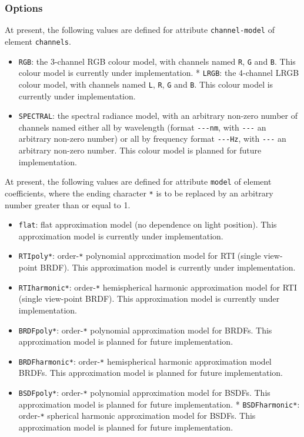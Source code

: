 \hypertarget{options}{%
\subsubsection{Options}\label{options}}

At present, the following values are defined for attribute
\texttt{channel-model} of element \texttt{channels}.
\begin{itemize}
\item \texttt{RGB}: the
3-channel RGB colour model, with channels named \texttt{R}, \texttt{G}
and \texttt{B}. This colour model is currently under implementation. *
\texttt{LRGB}: the 4-channel LRGB colour model, with channels named
\texttt{L}, \texttt{R}, \texttt{G} and \texttt{B}. This colour model is
currently under implementation.
\item \texttt{SPECTRAL}: the spectral
radiance model, with an arbitrary non-zero number of channels named
either all by wavelength (format \texttt{-\/-\/-nm}, with
\texttt{-\/-\/-} an arbitrary non-zero number) or all by frequency
format \texttt{-\/-\/-Hz}, with \texttt{-\/-\/-} an arbitrary non-zero
number. This colour model is planned for future implementation.
\end{itemize}

At present, the following values are defined for attribute
\texttt{model} of element coefficients, where the ending character
\texttt{*} is to be replaced by an arbitrary number greater than or
equal to 1.
\begin{itemize}
\item \texttt{flat}: flat approximation model (no dependence on
light position). This approximation model is currently under
implementation.
\item \texttt{RTIpoly*}: order-\texttt{*} polynomial
approximation model for RTI (single view-point BRDF). This approximation
model is currently under implementation.
\item \texttt{RTIharmonic*}:
order-\texttt{*} hemispherical harmonic approximation model for RTI
(single view-point BRDF). This approximation model is currently under
implementation.
\item \texttt{BRDFpoly*}: order-\texttt{*} polynomial
approximation model for BRDFs. This approximation model is planned for
future implementation.
\item \texttt{BRDFharmonic*}: order-\texttt{*}
hemispherical harmonic approximation model BRDFs. This approximation
model is planned for future implementation.
\item \texttt{BSDFpoly*}:
order-\texttt{*} polynomial approximation model for BSDFs. This
approximation model is planned for future implementation. *
\texttt{BSDFharmonic*}: order-\texttt{*} spherical harmonic
approximation model for BSDFs. This approximation model is planned for
future implementation.
\end{itemize}

